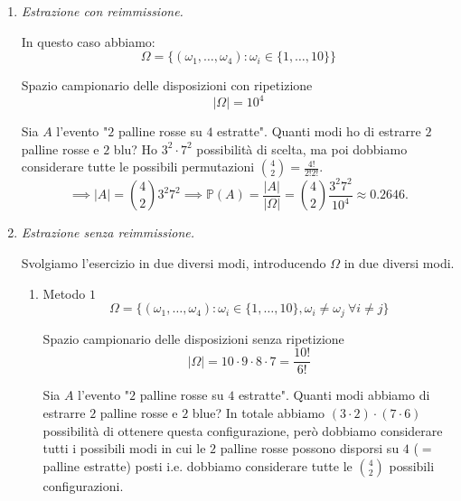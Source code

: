\begin{enumerate}
\item \textit{Estrazione con reimmissione.}

In questo caso abbiamo:\begin{equation*}
\Omega =\{( \omega _{1} ,\dotsc ,\omega _{4}) :\omega _{i} \in \{1,\dotsc ,10\}\}
\end{equation*}

Spazio campionario delle disposizioni con ripetizione\begin{equation*}
| \Omega | =10^{4}
\end{equation*}

Sia $A$ l'evento "$2$ palline rosse su $4$ estratte". Quanti modi ho di estrarre $2$ palline rosse e $2$ blu? Ho $3^{2} \cdot 7^{2}$ possibilità di scelta, ma poi dobbiamo considerare tutte le possibili permutazioni $\binom{4}{2} =\frac{4!}{2!2!}$.\begin{equation*}
\implies | A| =\binom{4}{2} 3^{2} 7^{2}\mathbb{\implies P}( A) =\frac{| A| }{| \Omega | } =\binom{4}{2}\frac{3^{2} 7^{2}}{10^{4}} \approx 0.2646.
\end{equation*}
\item \textit{Estrazione senza reimmissione.}

Svolgiamo l'esercizio in due diversi modi, introducendo $\Omega $ in due diversi modi.
\begin{enumerate}
\item Metodo $1$\begin{equation*}
\Omega =\{( \omega _{1} ,\dotsc ,\omega _{4}) :\omega _{i} \in \{1,\dotsc ,10\} ,\omega _{i} \neq \omega _{j} \ \forall i\neq j\}
\end{equation*}

Spazio campionario delle disposizioni senza ripetizione\begin{equation*}
| \Omega | =10\cdot 9\cdot 8\cdot 7=\frac{10!}{6!}
\end{equation*}

Sia $A$ l'evento "$2$ palline rosse su $4$ estratte". Quanti modi abbiamo di estrarre $2$ palline rosse e $2$ blue? In totale abbiamo $( 3\cdot 2) \cdot ( 7\cdot 6)$ possibilità di ottenere questa configurazione, però dobbiamo considerare tutti i possibili modi in cui le $2$ palline rosse possono disporsi su $4$ ($=$palline estratte) posti i.e. dobbiamo considerare tutte le $\binom{4}{2}$ possibili configurazioni.


\end{enumerate}
\end{enumerate}
